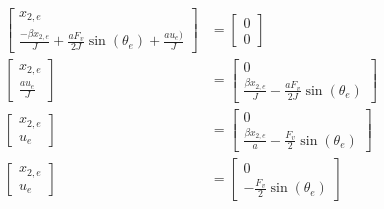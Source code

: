\documentclass[a4paper, 11pt]{article}
\begin{document}
    \begin{align*}
    	\begin{bmatrix}
            x_{2,e}\\ \frac{ - \beta x_{2,e}}{J} + \frac{a F_v}{2J}\sin{ (\theta_e) } + \frac{a u_e)} {J}
        \end{bmatrix}&=\begin{bmatrix}
            0 \\ 0
        \end{bmatrix}
        \\
        \begin{bmatrix}
            x_{2,e}\\  \frac{a u_e} {J}
        \end{bmatrix}&=\begin{bmatrix}
            0 \\ \frac{ \beta x_{2,e}}{J} - \frac{a F_v}{2J}\sin{ (\theta_e) }
        \end{bmatrix}
        \\
        \begin{bmatrix}
            x_{2,e}\\  u_e
        \end{bmatrix}&=\begin{bmatrix}
            0 \\ \frac{ \beta x_{2,e}}{a} - \frac{F_v}{2}\sin{ (\theta_e) }
        \end{bmatrix}
        \\
        \begin{bmatrix}
            x_{2,e}\\  u_e
        \end{bmatrix}&=\begin{bmatrix}
            0 \\ - \frac{F_v}{2}\sin{ (\theta_e) }
        \end{bmatrix}
    \end{align*}
\end{document}
